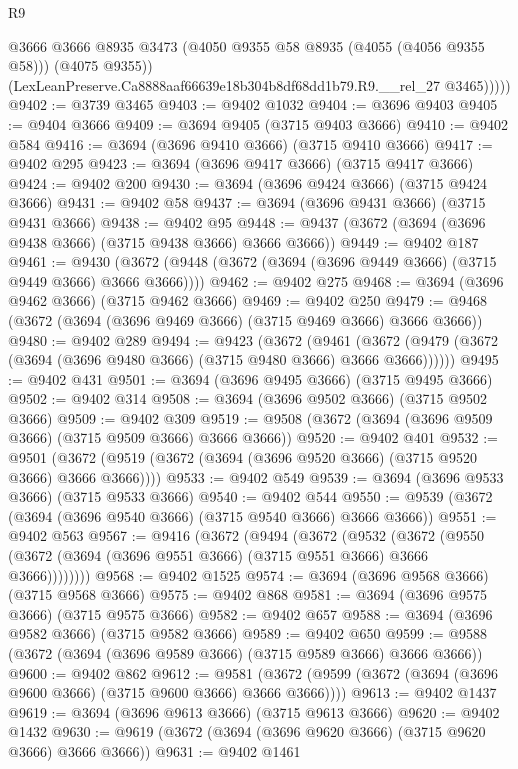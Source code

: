 \begin{lexlean}{R9}
\begin{coremodule}
              @3666
              @3666
              @8935
              @3473
              (@4050 @9355 @58 @8935 (@4055 (@4056 @9355 @58)))
              (@4075 @9355))
            (LexLeanPreserve.Ca8888aaf66639e18b304b8df68dd1b79.R9.__rel_27 @3465)))))
@9402 := @3739 @3465
@9403 := @9402 @1032
@9404 := @3696 @9403
@9405 := @9404 @3666
@9409 := @3694 @9405 (@3715 @9403 @3666)
@9410 := @9402 @584
@9416 := @3694 (@3696 @9410 @3666) (@3715 @9410 @3666)
@9417 := @9402 @295
@9423 := @3694 (@3696 @9417 @3666) (@3715 @9417 @3666)
@9424 := @9402 @200
@9430 := @3694 (@3696 @9424 @3666) (@3715 @9424 @3666)
@9431 := @9402 @58
@9437 := @3694 (@3696 @9431 @3666) (@3715 @9431 @3666)
@9438 := @9402 @95
@9448 := @9437 (@3672 (@3694 (@3696 @9438 @3666) (@3715 @9438 @3666) @3666 @3666))
@9449 := @9402 @187
@9461 := @9430 (@3672 (@9448 (@3672 (@3694 (@3696 @9449 @3666) (@3715 @9449 @3666) @3666 @3666))))
@9462 := @9402 @275
@9468 := @3694 (@3696 @9462 @3666) (@3715 @9462 @3666)
@9469 := @9402 @250
@9479 := @9468 (@3672 (@3694 (@3696 @9469 @3666) (@3715 @9469 @3666) @3666 @3666))
@9480 := @9402 @289
@9494 := @9423
    (@3672
      (@9461 (@3672 (@9479 (@3672 (@3694 (@3696 @9480 @3666) (@3715 @9480 @3666) @3666 @3666))))))
@9495 := @9402 @431
@9501 := @3694 (@3696 @9495 @3666) (@3715 @9495 @3666)
@9502 := @9402 @314
@9508 := @3694 (@3696 @9502 @3666) (@3715 @9502 @3666)
@9509 := @9402 @309
@9519 := @9508 (@3672 (@3694 (@3696 @9509 @3666) (@3715 @9509 @3666) @3666 @3666))
@9520 := @9402 @401
@9532 := @9501 (@3672 (@9519 (@3672 (@3694 (@3696 @9520 @3666) (@3715 @9520 @3666) @3666 @3666))))
@9533 := @9402 @549
@9539 := @3694 (@3696 @9533 @3666) (@3715 @9533 @3666)
@9540 := @9402 @544
@9550 := @9539 (@3672 (@3694 (@3696 @9540 @3666) (@3715 @9540 @3666) @3666 @3666))
@9551 := @9402 @563
@9567 := @9416
    (@3672
      (@9494
        (@3672
          (@9532
            (@3672 (@9550 (@3672 (@3694 (@3696 @9551 @3666) (@3715 @9551 @3666) @3666 @3666))))))))
@9568 := @9402 @1525
@9574 := @3694 (@3696 @9568 @3666) (@3715 @9568 @3666)
@9575 := @9402 @868
@9581 := @3694 (@3696 @9575 @3666) (@3715 @9575 @3666)
@9582 := @9402 @657
@9588 := @3694 (@3696 @9582 @3666) (@3715 @9582 @3666)
@9589 := @9402 @650
@9599 := @9588 (@3672 (@3694 (@3696 @9589 @3666) (@3715 @9589 @3666) @3666 @3666))
@9600 := @9402 @862
@9612 := @9581 (@3672 (@9599 (@3672 (@3694 (@3696 @9600 @3666) (@3715 @9600 @3666) @3666 @3666))))
@9613 := @9402 @1437
@9619 := @3694 (@3696 @9613 @3666) (@3715 @9613 @3666)
@9620 := @9402 @1432
@9630 := @9619 (@3672 (@3694 (@3696 @9620 @3666) (@3715 @9620 @3666) @3666 @3666))
@9631 := @9402 @1461

\end{coremodule}
\end{lexlean}
